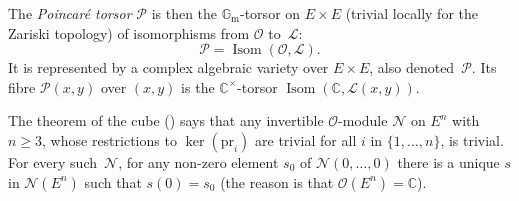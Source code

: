 \documentclass[JEP,XML,SOM,Unicode,NoFloatCountersInSection]{cedram}
\let\mathcal\mathscr
\theoremstyle{plain}
\theoremstyle{definition}
\numberwithin{equation}{subsection}
\renewcommand{\C}{\mathbb C}
\renewcommand{\G}{\mathbb G}
\newcommand{\calL}{\mathcal{L}}
\newcommand{\calN}{\mathcal{N}}
\newcommand{\calO}{\mathcal{O}}
\newcommand{\calP}{\mathcal{P}}
\newcommand{\Gm}{\G_{\mathrm{m}}}
\newcommand{\pr}{\mathrm{pr}}
\DeclareMathOperator{\Isom}{Isom}
\begin{document}
The \emph{Poincaré torsor} $\calP$ is then the $\Gm$-torsor on
$E\times E$ (trivial locally for the Zariski topology) of isomorphisms
from $\calO$ to~$\calL$:
\begin{equation}\label{eqn:defPtorsor}
\calP = \Isom(\calO,\calL).
\end{equation}
It is represented by a complex algebraic variety over $E\times E$,
also denoted~$\calP$. Its fibre $\calP(x,y)$ over $(x,y)$ is
the $\C^\times$-torsor $\Isom(\C,\calL(x,y))$.

The theorem of the cube (\cite[\S 6]{MumfordAV}) says that any
invertible $\calO$-module $\calN$ on $E^n$ with $n\geq3$, whose
restrictions to $\ker(\pr_i)$ are trivial for all $i$ in
$\{1,\ldots,n\}$, is trivial. For every such~$\calN$, for any non-zero
element $s_0$ of $\calN(0,\ldots,0)$ there is a unique $s$ in
$\calN(E^n)$ such that $s(0)=s_0$ (the reason is that
$\calO(E^n)=\C$).
\end{document}
